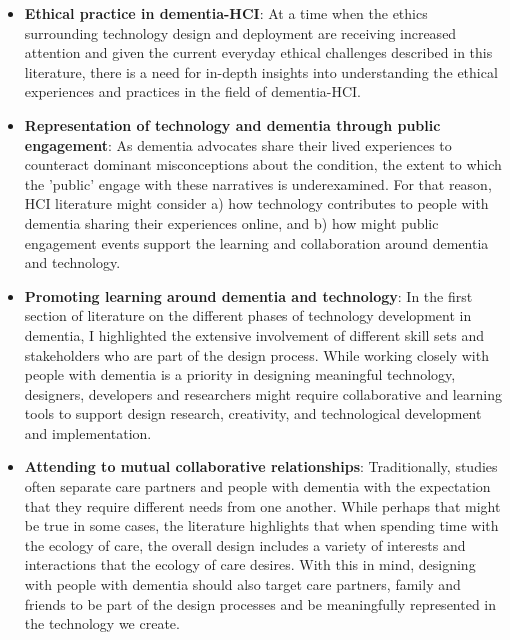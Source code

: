 \begin{itemize}
    \item \textbf{Ethical practice in dementia-HCI}: At a time when the ethics surrounding technology design and deployment are receiving increased attention and given the current everyday ethical challenges described in this literature, there is a need for in-depth insights into understanding the ethical experiences and practices in the field of dementia-HCI.
    
    \item \textbf{Representation of technology and dementia through public engagement}: As dementia advocates share their lived experiences to counteract dominant misconceptions about the condition, the extent to which the 'public' engage with these narratives is underexamined. For that reason, HCI literature might consider a) how technology contributes to people with dementia sharing their experiences online, and b) how might public engagement events support the learning and collaboration around dementia and technology.

    \item \textbf{Promoting learning around dementia and technology}: In the first section of literature on the different phases of technology development in dementia, I highlighted the extensive involvement of different skill sets and stakeholders who are part of the design process. While working closely with people with dementia is a priority in designing meaningful technology, designers, developers and researchers might require collaborative and learning tools to support design research, creativity, and technological development and implementation.  
    
    \item \textbf{Attending to mutual collaborative relationships}: Traditionally, studies often separate care partners and people with dementia with the expectation that they require different needs from one another. While perhaps that might be true in some cases, the literature highlights that when spending time with the ecology of care, the overall design includes a variety of interests and interactions that the ecology of care desires. With this in mind, designing with people with dementia should also target care partners, family and friends to be part of the design processes and be meaningfully represented in the technology we create.

\end{itemize}

